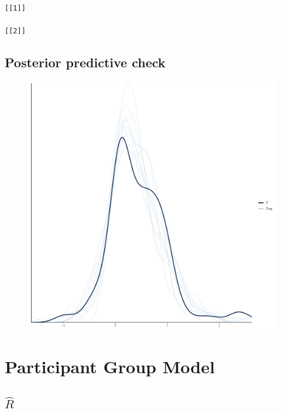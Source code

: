 \documentclass[
]{report}
\begin{document}
\begin{verbatim}
[[1]]

[[2]]
\end{verbatim}

\hypertarget{posterior-predictive-check-1}{%
\section{Posterior predictive
check}\label{posterior-predictive-check-1}}

\begin{figure}

{\centering \includegraphics[width=1\textwidth,height=\textheight]{diagnostic_plots_files/figure-pdf/unnamed-chunk-6-1.pdf}

}

\end{figure}

\hypertarget{participant-group-model}{%
\chapter{Participant Group Model}\label{participant-group-model}}

\hypertarget{hatr-2}{%
\section{\texorpdfstring{\(\hat{R}\)}{\textbackslash hat\{R\}}}\label{hatr-2}}
\end{document}
